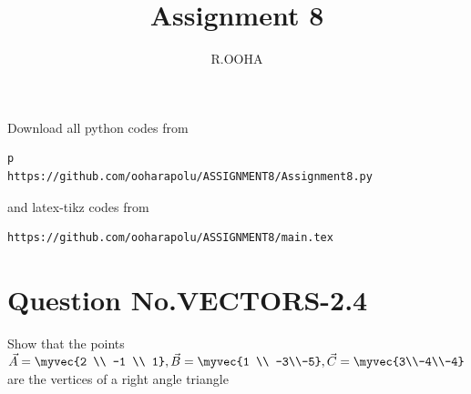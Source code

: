 \documentclass[journal,12pt,twocolumn]{IEEEtran}
\begin{document}
     \def\rightbox#1{\makebox[0in][r]{#1}}
     \def\centbox#1{\makebox[0in]{#1}}
     \def\topbox#1{\raisebox{-\baselineskip}[0in][0in]{#1}}
     \def\midbox#1{\raisebox{-0.5\baselineskip}[0in][0in]{#1}}
\vspace{3cm}
\title{Assignment 8}
\author{R.OOHA}
\maketitle
\newpage
\bigskip
\renewcommand{\thefigure}{\theenumi}
\renewcommand{\thetable}{\theenumi}
Download all python codes from 
\begin{lstlisting}p
https://github.com/ooharapolu/ASSIGNMENT8/Assignment8.py
\end{lstlisting}
%
and latex-tikz codes from 
%
\begin{lstlisting}
https://github.com/ooharapolu/ASSIGNMENT8/main.tex
\end{lstlisting}
%
\section{Question No.VECTORS-2.4}
\item Show that the points 
$\vec{A} = \myvec{2 \\ -1 \\ 1},\vec{B}=\myvec{1 \\ -3\\-5},\vec{C}=\myvec{3\\-4\\-4}$
are the vertices of a right angle triangle
%
\end{document}

